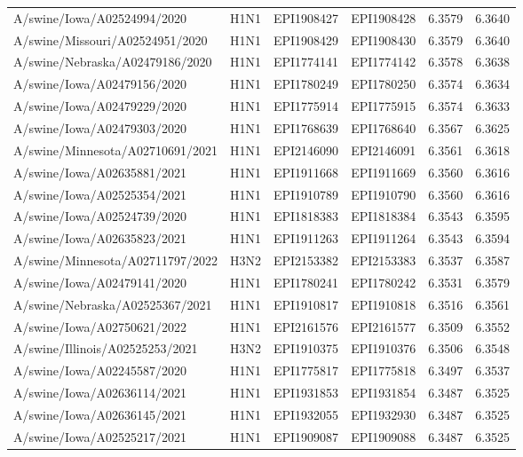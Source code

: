 \begin{tabular}{L{1.95in}|L{.25in}|L{.60in}|L{.6in}|C{1in}|C{1in}}
 A/swine/Iowa/A02524994/2020 &H1N1&EPI1908427&EPI1908428&6.3579&6.3640\\
 A/swine/Missouri/A02524951/2020 &H1N1&EPI1908429&EPI1908430&6.3579&6.3640\\
 A/swine/Nebraska/A02479186/2020 &H1N1&EPI1774141&EPI1774142&6.3578&6.3638\\
 A/swine/Iowa/A02479156/2020 &H1N1&EPI1780249&EPI1780250&6.3574&6.3634\\
 A/swine/Iowa/A02479229/2020 &H1N1&EPI1775914&EPI1775915&6.3574&6.3633\\
 A/swine/Iowa/A02479303/2020 &H1N1&EPI1768639&EPI1768640&6.3567&6.3625\\
 A/swine/Minnesota/A02710691/2021 &H1N1&EPI2146090&EPI2146091&6.3561&6.3618\\
 A/swine/Iowa/A02635881/2021 &H1N1&EPI1911668&EPI1911669&6.3560&6.3616\\
 A/swine/Iowa/A02525354/2021 &H1N1&EPI1910789&EPI1910790&6.3560&6.3616\\
 A/swine/Iowa/A02524739/2020 &H1N1&EPI1818383&EPI1818384&6.3543&6.3595\\
 A/swine/Iowa/A02635823/2021 &H1N1&EPI1911263&EPI1911264&6.3543&6.3594\\
 A/swine/Minnesota/A02711797/2022 &H3N2&EPI2153382&EPI2153383&6.3537&6.3587\\
 A/swine/Iowa/A02479141/2020 &H1N1&EPI1780241&EPI1780242&6.3531&6.3579\\
 A/swine/Nebraska/A02525367/2021 &H1N1&EPI1910817&EPI1910818&6.3516&6.3561\\
 A/swine/Iowa/A02750621/2022 &H1N1&EPI2161576&EPI2161577&6.3509&6.3552\\
 A/swine/Illinois/A02525253/2021 &H3N2&EPI1910375&EPI1910376&6.3506&6.3548\\
 A/swine/Iowa/A02245587/2020 &H1N1&EPI1775817&EPI1775818&6.3497&6.3537\\
 A/swine/Iowa/A02636114/2021 &H1N1&EPI1931853&EPI1931854&6.3487&6.3525\\
 A/swine/Iowa/A02636145/2021 &H1N1&EPI1932055&EPI1932930&6.3487&6.3525\\
 A/swine/Iowa/A02525217/2021 &H1N1&EPI1909087&EPI1909088&6.3487&6.3525\\

\end{tabular}
